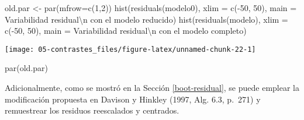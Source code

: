 \documentclass[
]{book}
\newenvironment{Shaded}{\begin{snugshade}}{\end{snugshade}}
\newcommand{\AttributeTok}[1]{\textcolor[rgb]{0.77,0.63,0.00}{#1}}
\newcommand{\DecValTok}[1]{\textcolor[rgb]{0.00,0.00,0.81}{#1}}
\newcommand{\FunctionTok}[1]{\textcolor[rgb]{0.00,0.00,0.00}{#1}}
\newcommand{\NormalTok}[1]{#1}
\newcommand{\OtherTok}[1]{\textcolor[rgb]{0.56,0.35,0.01}{#1}}
\newcommand{\SpecialCharTok}[1]{\textcolor[rgb]{0.00,0.00,0.00}{#1}}
\newcommand{\StringTok}[1]{\textcolor[rgb]{0.31,0.60,0.02}{#1}}
\theoremstyle{break}
\theoremstyle{definition}
\theoremstyle{definition}
\theoremstyle{definition}
\theoremstyle{definition}
\theoremstyle{remark}
\begin{document}
\begin{Shaded}
\begin{Highlighting}[]
\NormalTok{old.par }\OtherTok{\textless{}{-}} \FunctionTok{par}\NormalTok{(}\AttributeTok{mfrow=}\FunctionTok{c}\NormalTok{(}\DecValTok{1}\NormalTok{,}\DecValTok{2}\NormalTok{))}
\FunctionTok{hist}\NormalTok{(}\FunctionTok{residuals}\NormalTok{(modelo0), }\AttributeTok{xlim =} \FunctionTok{c}\NormalTok{(}\SpecialCharTok{{-}}\DecValTok{50}\NormalTok{, }\DecValTok{50}\NormalTok{), }
     \AttributeTok{main =} \StringTok{\textquotesingle{}Variabilidad residual}\SpecialCharTok{\textbackslash{}n}\StringTok{ con el modelo reducido\textquotesingle{}}\NormalTok{)}
\FunctionTok{hist}\NormalTok{(}\FunctionTok{residuals}\NormalTok{(modelo), }\AttributeTok{xlim =} \FunctionTok{c}\NormalTok{(}\SpecialCharTok{{-}}\DecValTok{50}\NormalTok{, }\DecValTok{50}\NormalTok{), }
     \AttributeTok{main =} \StringTok{\textquotesingle{}Variabilidad residual}\SpecialCharTok{\textbackslash{}n}\StringTok{ con el modelo completo\textquotesingle{}}\NormalTok{)}
\end{Highlighting}
\end{Shaded}

\begin{center}\texttt{[image: 05-contrastes\_files/figure-latex/unnamed-chunk-22-1]} \end{center}

\begin{Shaded}
\begin{Highlighting}[]
\FunctionTok{par}\NormalTok{(old.par)}
\end{Highlighting}
\end{Shaded}

Adicionalmente, como se mostró en la Sección \ref{boot-residual}, se puede emplear
la modificación propuesta en Davison y Hinkley (1997, Alg. 6.3, p.~271)
y remuestrear los residuos reescalados y centrados.
\end{document}

